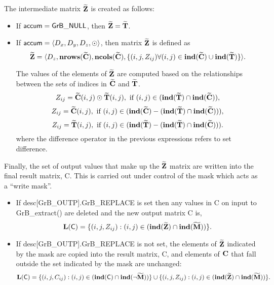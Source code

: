 The intermediate matrix ${\bf \widetilde{Z}}$ is created as follows:
\begin{itemize}
    \item If ${\sf accum} = {\sf GrB\_NULL}$, then ${\bf \widetilde{Z}} = {\bf \widetilde{T}}$.

    \item If ${\sf accum} = \langle D_x, D_y, D_z, \odot \rangle$, then matrix ${\bf \widetilde{Z}}$ is defined as 
        \[ 
        {\bf \widetilde{Z}} = 
        \langle D_z, \bold{nrows}({\bf \widetilde{C}}), \bold{ncols}({\bf \widetilde{C}}),
		\{(i,j,Z_{ij})  \forall (i,j) \in \bold{ind}({\bf \widetilde{C}}) \cup 
        \bold{ind}({\bf \widetilde{T}}) \} \rangle. \]

        The values of the elements of ${\bf \widetilde{Z}}$ are computed based on the 
        relationships between the sets of indices in ${\bf \widetilde{C}}$ and 
        ${\bf \widetilde{T}}$.
\[
Z_{ij} = {\bf \widetilde{C}}(i,j) \odot {\bf \widetilde{T}}(i,j), \ \mbox{if}\  (i,j) \in  (\bold{ind}({\bf \widetilde{T}}) \cap \bold{ind}({\bf \widetilde{C}})),
\]
\[
Z_{ij} = {\bf \widetilde{C}}(i,j), \ \mbox{if}\  (i,j) \in  (\bold{ind}({\bf \widetilde{C}}) - (\bold{ind}({\bf \widetilde{T}}) \cap \bold{ind}({\bf \widetilde{C}}))),
\]
\[
Z_{ij} = {\bf \widetilde{T}}(i,j), \ \mbox{if}\  (i,j) \in  (\bold{ind}({\bf \widetilde{T}}) - (\bold{ind}({\bf \widetilde{T}}) \cap \bold{ind}({\bf \widetilde{C}}))).
\]
where the difference operator in the previous expressions refers to set difference.
\end{itemize}

Finally, the set of output values that make up the ${\bf \widetilde{Z}}$ 
matrix are written into the final result matrix, {\sf C}. 
This is carried out under control of the mask which acts as a ``write mask''.
\begin{itemize}
\item If {\sf desc[GrB\_OUTP].GrB\_REPLACE} is set then any values in {\sf C} 
on input to {\sf GrB\_extract()} are deleted and the new output matrix {\sf C} is,
\[ \bold{L}({\sf C}) = \{(i,j,Z_{ij}) : (i,j) \in (\bold{ind}({\bf \widetilde{Z}}) 
\cap \bold{ind}({\bf \widetilde{M}})) \}. \]

\item If {\sf desc[GrB\_OUTP].GrB\_REPLACE} is not set, the elements of 
${\bf \widetilde{Z}}$ indicated by 
the mask are copied into the result matrix, {\sf C}, and elements of 
${\bf C}$ that fall outside the set indicated by the mask are unchanged:
\[ \bold{L}({\sf C}) = \{(i,j,C_{ij}) : (i, j) \in (\bold{ind}({\sf C}) 
\cap \bold{ind}(\neg {\bf \widetilde{M}})) \} \cup \{(i,j,Z_{ij}) : (i,j) \in 
(\bold{ind}({\bf \widetilde{Z}}) \cap \bold{ind}({\bf \widetilde{M}})) \}. \]
\end{itemize}

